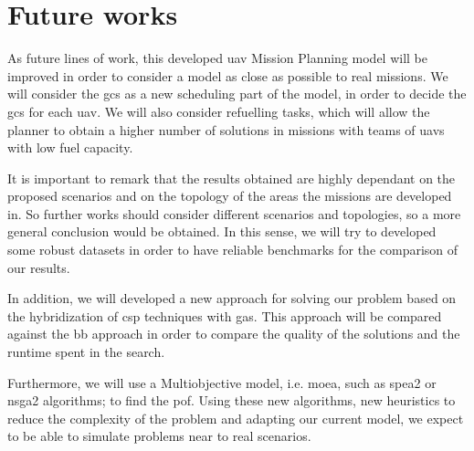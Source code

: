 \section{Future works}
As future lines of work, this developed \gls{uav} Mission Planning model will be improved in order to consider a model as close as possible to real missions. We will consider the \gls{gcs} as a new scheduling part of the model, in order to decide the \gls{gcs} for each \gls{uav}. We will also consider refuelling tasks, which will allow the planner to obtain a higher number of solutions in missions with teams of \glspl{uav} with low fuel capacity.

It is important to remark that the results obtained are highly dependant on the proposed scenarios and on the topology of the areas the missions are developed in. So further works should consider different scenarios and topologies, so a more general conclusion would be obtained. In this sense, we will try to developed some robust datasets in order to have reliable benchmarks for the comparison of our results.

In addition, we will developed a new approach for solving our problem based on the hybridization of \gls{csp} techniques with \glspl{ga}. This approach will be compared against the \gls{bb} approach in order to compare the quality of the solutions and the runtime spent in the search.

Furthermore, we will use a Multiobjective model, i.e. \gls{moea}, such as \gls{spea2} or \gls{nsga2} algorithms; to find the \gls{pof}. Using these new algorithms, new heuristics to reduce the complexity of the problem and adapting our current model, we expect to be able to simulate problems near to real scenarios.

